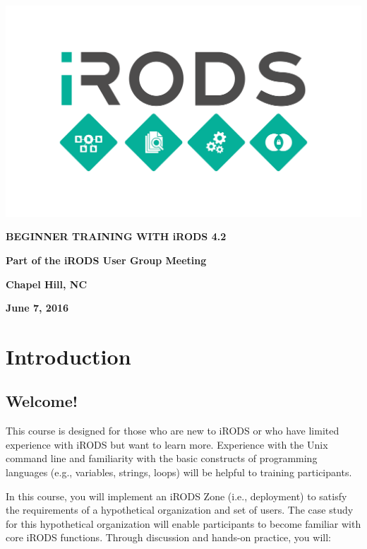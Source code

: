 \documentclass[10pt,oneside]{memoir}
\begin{document}
\thispagestyle{empty}

\centerline{\includegraphics[width=19cm]{diamond_logo}}

\begin{center}

\huge{\textbf{BEGINNER TRAINING WITH iRODS 4.2}}

\vspace{10mm}
\textbf{Part of the iRODS User Group Meeting}

\vspace{10mm}
\textbf{Chapel Hill, NC}

\vspace{10mm}
\textbf{June 7, 2016}

\end{center}

\newpage

\frontmatter

\tableofcontents*
\newpage

\chapter{Introduction}

\section{Welcome!}

This course is designed for those who are new to iRODS or who have limited experience with iRODS but want to learn more. Experience with the Unix command line and familiarity with the basic constructs of programming languages (e.g., variables, strings, loops) will be helpful to training participants.

In this course, you will implement an iRODS Zone (i.e., deployment) to satisfy the requirements of a hypothetical organization and set of users. The case study for this hypothetical organization will enable participants to become familiar with core iRODS functions. Through discussion and hands-on practice, you will:
\end{document}
